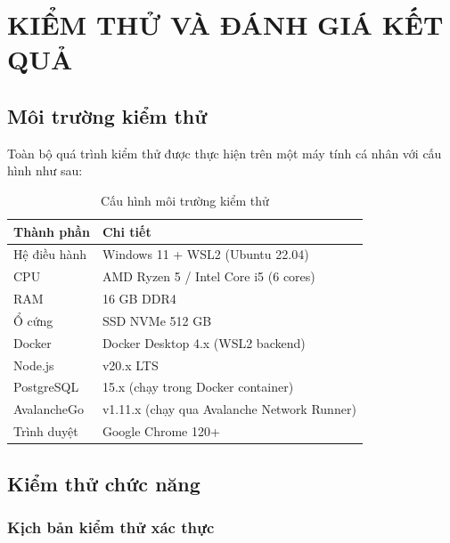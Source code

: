 \chapter{KIỂM THỬ VÀ ĐÁNH GIÁ KẾT QUẢ}

\section{Môi trường kiểm thử}

Toàn bộ quá trình kiểm thử được thực hiện trên một máy tính cá nhân với cấu hình như sau:

\begin{table}[H]
\centering
\caption{Cấu hình môi trường kiểm thử}
\label{tab:test_environment}
\begin{tabular}{|l|p{8cm}|}
\hline
\textbf{Thành phần} & \textbf{Chi tiết} \\ \hline
Hệ điều hành & Windows 11 + WSL2 (Ubuntu 22.04) \\ \hline
CPU & AMD Ryzen 5 / Intel Core i5 (6 cores) \\ \hline
RAM & 16 GB DDR4 \\ \hline
Ổ cứng & SSD NVMe 512 GB \\ \hline
Docker & Docker Desktop 4.x (WSL2 backend) \\ \hline
Node.js & v20.x LTS \\ \hline
PostgreSQL & 15.x (chạy trong Docker container) \\ \hline
AvalancheGo & v1.11.x (chạy qua Avalanche Network Runner) \\ \hline
Trình duyệt & Google Chrome 120+ \\ \hline
\end{tabular}
\end{table}

\section{Kiểm thử chức năng}

\subsection{Kịch bản kiểm thử xác thực}

